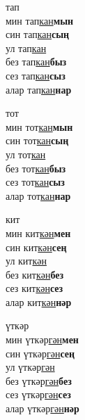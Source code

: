 \begin{multicols}{4}
\begin{enumerate}
\begin{minipage}{\linewidth}
    \item
    тап\\
    мин тап\underline{кан}\textbf{мын}\\
    син тап\underline{кан}\textbf{сың}\\
    ул тап\underline{кан}\\
    без тап\underline{кан}\textbf{быз}\\
    сез тап\underline{кан}\textbf{сыз}\\
    алар тап\underline{кан}\textbf{нар}\\
\end{minipage}

\begin{minipage}{\linewidth}
    \item
    тот\\
    мин тот\underline{кан}\textbf{мын}\\
    син тот\underline{кан}\textbf{сың}\\
    ул тот\underline{кан}\\
    без тот\underline{кан}\textbf{быз}\\
    сез тот\underline{кан}\textbf{сыз}\\
    алар тот\underline{кан}\textbf{нар}\\
\end{minipage}

\begin{minipage}{\linewidth}
    \item
    кит\\
    мин кит\underline{кән}\textbf{мен}\\
    син кит\underline{кән}\textbf{сең}\\
    ул кит\underline{кән}\\
    без кит\underline{кән}\textbf{без}\\
    сез кит\underline{кән}\textbf{сез}\\
    алар кит\underline{кән}\textbf{нәр}\\
\end{minipage}

\begin{minipage}{\linewidth}
    \item
    үткәр\\
    мин үткәр\underline{гән}\textbf{мен}\\
    син үткәр\underline{гән}\textbf{сең}\\
    ул үткәр\underline{гән}\\
    без үткәр\underline{гән}\textbf{без}\\
    сез үткәр\underline{гән}\textbf{сез}\\
    алар үткәр\underline{гән}\textbf{нәр}\\
\end{minipage}


\end{enumerate}
\end{multicols}

